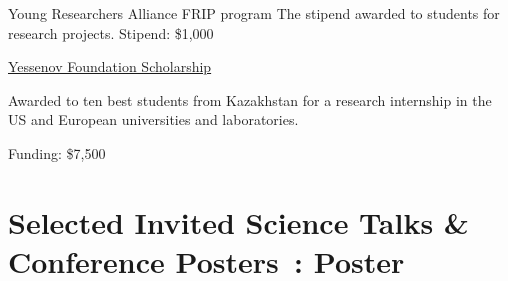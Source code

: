 \documentclass[10pt]{article} %
\begin{document}
\begin{paracol}{1}
	{Young Researchers Alliance FRIP program}
	{The stipend awarded to students for research projects. Stipend: \$1,000}
	
	
	\nonstopmode
	{\href{http://yessenovfoundation.org/en/}{Yessenov Foundation Scholarship}}
	{Awarded to ten best students from Kazakhstan for a research  internship in the US and European universities and laboratories. 
	
	Funding: \$7,500}
	
	



\section{Selected Invited Science Talks \& Conference Posters \footnotesize {\faFileImageO}\,: Poster \phantom{XX.}}





	





\end{paracol}
\end{document}
